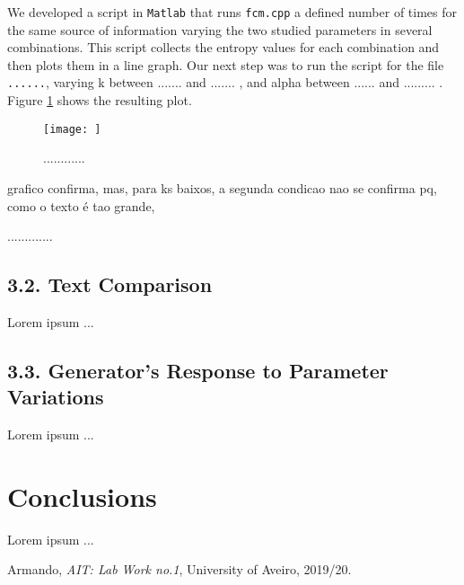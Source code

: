 \documentclass[12pt]{article}
\begin{document}
We developed a script in \texttt{Matlab} that runs \texttt{fcm.cpp} a
defined number of times for the same source of information varying the 
two studied parameters in several combinations.
This script collects the entropy values for each combination and then plots
them in a line graph.
Our next step was to run the script for the file \texttt{......}, varying
k between ....... and ....... , and alpha between ...... and ......... .
Figure \ref{fig:plot} shows the resulting plot.

\begin{figure}[h!]
  \texttt{[image: ]}
  \caption{............}
  \label{fig:plot}
\end{figure}

grafico confirma, mas, para ks baixos, a segunda condicao nao se confirma
pq, como o texto é tao grande, 

.............

\subsection*{3.2. Text Comparison}

Lorem ipsum ...

\subsection*{3.3. Generator's Response to Parameter Variations}

Lorem ipsum ...

\section*{Conclusions}

Lorem ipsum ...

\begin{thebibliography}{9}
  

    Armando,
    \textit{AIT: Lab Work no.1},
    University of Aveiro,
    2019/20.
  
\end{thebibliography}


\end{document}
